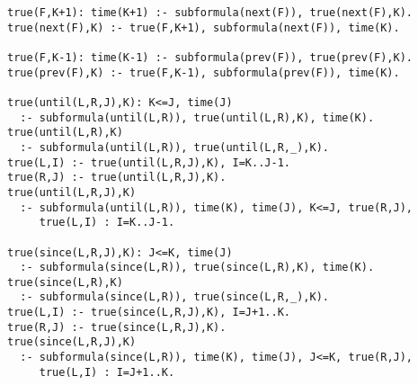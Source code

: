 \begin{center}
\begin{minipage}{\linewidth}
\begin{lstlisting}[language=clingo, label={lst:meta-telingo-one}]
true(F,K+1): time(K+1) :- subformula(next(F)), true(next(F),K).
true(next(F),K) :- true(F,K+1), subformula(next(F)), time(K).

true(F,K-1): time(K-1) :- subformula(prev(F)), true(prev(F),K).
true(prev(F),K) :- true(F,K-1), subformula(prev(F)), time(K).

true(until(L,R,J),K): K<=J, time(J)
  :- subformula(until(L,R)), true(until(L,R),K), time(K).
true(until(L,R),K)
  :- subformula(until(L,R)), true(until(L,R,_),K).
true(L,I) :- true(until(L,R,J),K), I=K..J-1.
true(R,J) :- true(until(L,R,J),K).
true(until(L,R,J),K)
  :- subformula(until(L,R)), time(K), time(J), K<=J, true(R,J), 
     true(L,I) : I=K..J-1.

true(since(L,R,J),K): J<=K, time(J)
  :- subformula(since(L,R)), true(since(L,R),K), time(K).
true(since(L,R),K)
  :- subformula(since(L,R)), true(since(L,R,_),K).
true(L,I) :- true(since(L,R,J),K), I=J+1..K.
true(R,J) :- true(since(L,R,J),K).
true(since(L,R,J),K)
  :- subformula(since(L,R)), time(K), time(J), J<=K, true(R,J), 
     true(L,I) : I=J+1..K.
\end{lstlisting}
\end{minipage}
\end{center}

